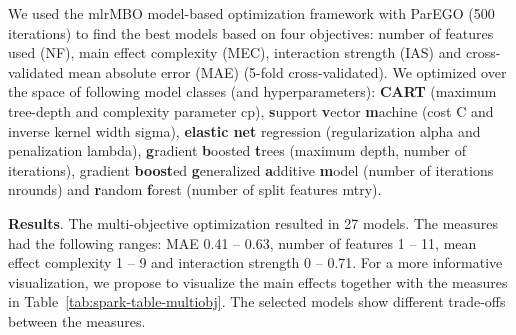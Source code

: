 \documentclass[runningheads]{llncs}\usepackage[]{graphicx}\usepackage[]{color}
\begin{document}
We used the mlrMBO model-based optimization framework \citep{horn2016multi} with ParEGO \citep{knowles2006parego} (500 iterations) to find the best models based on four objectives: number of features used (NF), main effect complexity (MEC), interaction strength (IAS) and cross-validated mean absolute error (MAE) (5-fold cross-validated).
We optimized over the space of following model classes (and hyperparameters): \textbf{CART} (maximum tree-depth and complexity parameter cp), \textbf{s}upport \textbf{v}ector \textbf{m}achine (cost C and inverse kernel width sigma), \textbf{elastic net} regression (regularization alpha and penalization lambda), \textbf{g}radient \textbf{b}oosted \textbf{t}rees (maximum depth, number of iterations), gradient \textbf{boost}ed \textbf{g}eneralized \textbf{a}dditive \textbf{m}odel (number of iterations nrounds) and \textbf{r}andom \textbf{f}orest (number of split features mtry).

\textbf{Results}.
The multi-objective optimization resulted in 27 models.
The measures had the following ranges: MAE 0.41 -- 0.63, number of features 1 --  11, mean effect complexity 1 -- 9 and interaction strength 0 -- 0.71.
For a more informative visualization, we propose to visualize the main effects together with the measures in Table~\ref{tab:spark-table-multiobj}.
The selected models show different trade-offs between the measures.
\end{document}
